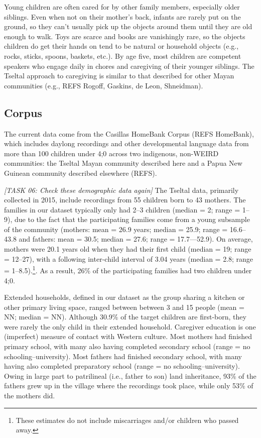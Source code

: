 \documentclass[floatsintext,man]{apa6}
\theoremstyle{definition}
\theoremstyle{definition}
\theoremstyle{definition}
\theoremstyle{remark}
\begin{document}
Young children are often cared for by other family members, especially
older siblings. Even when not on their mother's back, infants are rarely
put on the ground, so they can't usually pick up the objects around them
until they are old enough to walk. Toys are scarce and books are
vanishingly rare, so the objects children do get their hands on tend to
be natural or household objects (e.g., rocks, sticks, spoons, baskets,
etc.). By age five, most children are competent speakers who engage
daily in chores and caregiving of their younger siblings. The Tseltal
approach to caregiving is similar to that described for other Mayan
communities (e.g., REFS Rogoff, Gaskins, de Leon, Shneidman).

\subsection{Corpus}\label{methods-corpus}

The current data come from the Casillas HomeBank Corpus (REFS HomeBank),
which includes daylong recordings and other developmental language data
from more than 100 children under 4;0 across two indigenous, non-WEIRD
communities: the Tseltal Mayan community described here and a Papua New
Guinean community described elsewhere (REFS).

\emph{{[}TASK 06: Check these demographic data again{]}} The Tseltal
data, primarily collected in 2015, include recordings from 55 children
born to 43 mothers. The families in our dataset typically only had 2--3
children (median = 2; range = 1--9), due to the fact that the
participating families come from a young subsample of the community
(mothers: mean = 26.9 years; median = 25.9; range = 16.6--43.8 and
fathers: mean = 30.5; median = 27.6; range = 17.7---52.9). On average,
mothers were 20.1 years old when they had their first child (median =
19; range = 12--27), with a following inter-child interval of 3.04 years
(median = 2.8; range =
1--8.5).\footnote{These estimates do not include miscarriages and/or children who passed away.}.
As a result, 26\% of the participating families had two children under
4;0.

Extended households, defined in our dataset as the group sharing a
kitchen or other primary living space, ranged between between 3 and 15
people (mean = NN; median = NN). Although 30.9\% of the target children
are first-born, they were rarely the only child in their extended
household. Caregiver education is one (imperfect) measure of contact
with Western culture. Most mothers had finished primary school, with
many also having completed secondary school (range = no
schooling--university). Most fathers had finished secondary school, with
many having also completed preparatory school (range = no
schooling--university). Owing in large part to patrilineal (i.e., father
to son) land inheritance, 93\% of the fathers grew up in the village
where the recordings took place, while only 53\% of the mothers did.
\end{document}
